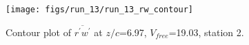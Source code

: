 \begin{figure}[H]
\centering
\texttt{[image: figs/run\_13/run\_13\_rw\_contour]}
\caption{Contour plot of $\overline{r^\prime w^\prime}$ at $z/c$=6.97, $V_{free}$=19.03, station 2.}
\label{fig:run_13_rw_contour}
\end{figure}


